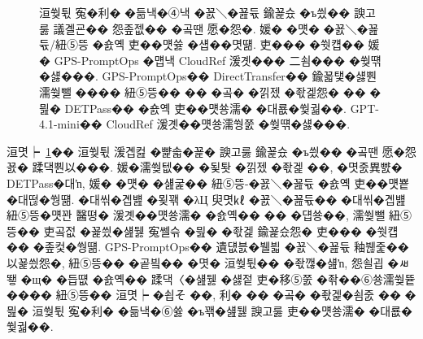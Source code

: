 \documentclass[10pt,twocolumn]{article}
\begin{document}
\begin{figure}[t]
\centering
{}
\caption{洹쒖튃 寃�利� �듦낵�④낵 �꾨＼�꾪듃 鍮꾩슜 �ъ씠�� 諛고룷 議곌굔�� 怨좊젮�� �곸땐 愿�怨�. 媛� �먯� �꾨＼�꾪듃/紐⑤뜽 �숈옉 吏��먯쓣 �섑��몃떎. 吏��� �쒓컙�� 媛� GPS-PromptOps �먭낵 CloudRef 湲곗��� 二쇰��� �쒖떆�섏���. GPS-PromptOps�� DirectTransfer�� 鍮꾧탳�섏뿬 濡쒖뺄 ���� 紐⑤뜽�� �� �곸� �낅젰 �좏겙怨� �� �믪� DETPass�� �숈옉 吏��먯쑝濡� �대룞�쒗궓��. GPT-4.1-mini�� CloudRef 湲곗��먯쑝濡쒕쭔 �쒖떆�섏���.}
\label{fig:deployment_tradeoff}
\end{figure}

洹몃┝~\ref{fig:deployment_tradeoff}�� 洹쒖튃 湲곕컲 �뺥솗�꾩� 諛고룷 鍮꾩슜 �ъ씠�� �곸땐 愿�怨꾨� 蹂댁뿬以���. 媛�濡쒖텞�� �됯퇏 �낅젰 �좏겙 ��, �몃줈異뺤� DETPass�대ŉ, 媛� �먯� �섎굹�� 紐⑤뜽-�꾨＼�꾪듃 �숈옉 吏��먯뿉 �대떦�쒕떎. �대씪�곕뱶 �묒꽦 �λЦ 臾몃㎘ �꾨＼�꾪듃�� �대씪�곕뱶 紐⑤뜽�먯꽌 醫뗭� 湲곗��먯쑝濡� �숈옉�� �� �덉쑝��, 濡쒖뺄 紐⑤뜽�� 吏곸젒 �꾩씠�섎뒗 寃쎌슦 �믪� �좏겙 鍮꾩슜怨� 吏��� �쒓컙�� �좊컻�쒕떎. GPS-PromptOps�� 遺덊븘�뷀븳 �꾨＼�꾪듃 釉붾줉�� 以꾩씠怨�, 紐⑤뜽�� �곹빀�� �몃� 洹쒖튃�� �좏깮�섎ŉ, 怨쇨굅 �ㅽ뙣 �щ� �듭떖 �숈옉�� 蹂댁〈�섎뒗 �섏젙 吏�移⑤쭔 �좎��⑥쑝濡쒖뜥 ���� 紐⑤뜽�� 洹몃┝ �쇱そ ��, 利� �� �곸� �좏겙�쇰줈 �� �믪� 洹쒖튃 寃�利� �듦낵�⑥쓣 �ъ꽦�섎뒗 諛고룷 吏��먯쑝濡� �대룞�쒗궓��.
\end{document}

